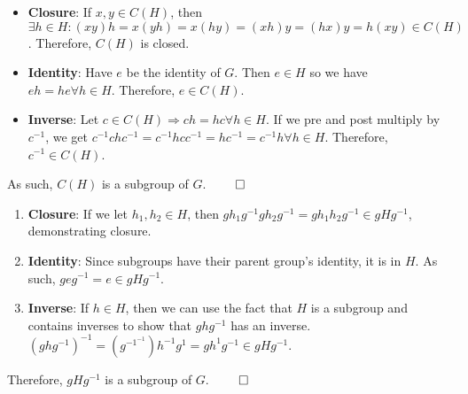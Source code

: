 \documentclass[12pt]{report}
\begin{document}
\sol
\begin{itemize}
    \item \textbf{Closure}: If $x,y \in C(H)$, then $\exists h \in H : (xy)h = x(yh) = x(hy) = (xh)y = (hx)y = h(xy) \in C(H)$. Therefore, $C(H)$ is closed. 
    \item \textbf{Identity}: Have $e$ be the identity of $G$. Then $e \in H$ so we have $eh = he \forall h \in H$. Therefore, $e \in C(H)$.
    \item \textbf{Inverse}: Let $c \in C(H) \Rightarrow ch = hc \forall h \in H$. If we pre and post multiply by $c^{-1}$, we get $c^{-1}chc^{-1} =c^{-1}hcc^{-1} = hc^{-1} = c^{-1}h \forall h \in H$. Therefore, $c^{-1} \in C(H)$.
\end{itemize}

As such, $C(H)$ is a subgroup of $G$. $\qed$

\sol
\begin{enumerate}
    \item \textbf{Closure}: If we let $h_1, h_2 \in H$, then $gh_1g^{-1}gh_2g^{-1} = gh_1h_2g^{-1} \in gHg^{-1}$, demonstrating closure.
    \item \textbf{Identity}: Since subgroups have their parent group's identity, it is in $H$. As such, $geg^{-1} = e \in gHg^{-1}$.
    \item \textbf{Inverse}: If $h \in H$, then we can use the fact that $H$ is a subgroup and contains inverses to show that $ghg^{-1}$ has an inverse. $(ghg^{-1})^{-1} = (g^{-1^{-1}})h^{-1}g^{1} = gh^{1}g^{-1} \in gHg^{-1}$. 
\end{enumerate}

Therefore, $gHg^{-1}$ is a subgroup of $G$. $\qed$
\end{document}
